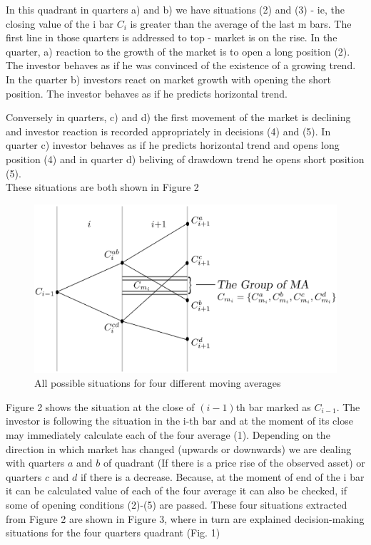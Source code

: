 \documentclass{tewiart}
\begin{document}
In this quadrant in quarters a) and b) we have situations (2) and (3) - ie, the closing value of the i bar $C_i$ is greater than the average of the last m bars. The first line in those quarters is addressed to top - market is on the rise. In the quarter, a) reaction to the growth of the market is to open a long position (2). The investor behaves as if he was convinced of the existence of a growing trend. In the quarter b) investors react on market growth with opening the short position. The investor behaves as if he predicts horizontal trend.

Conversely in quarters, c) and d) the first movement of the market is declining and investor reaction is recorded appropriately in decisions (4) and (5). In quarter c) investor behaves as if he predicts horizontal trend and opens long position (4) and in quarter d) beliving of drawdown trend he opens short position (5). \\
These situations are both shown in Figure 2\\
\begin{figure}[h]
\centering
\centering 
\includegraphics[width=\textwidth]{rysunek1pp.eps}
\caption{All possible situations for four different moving averages}
\end{figure}
\FloatBarrier
\indent Figure 2 shows the situation at the close of $(i-1)$th bar marked as $C_{i-1}$. The investor is following the situation in the i-th bar and at the moment of its close may immediately calculate each of the four average (1). Depending on the direction in which market has changed (upwards or downwards) we are dealing with quarters $a$ and $b$ of quadrant (If there is a price rise of the observed asset) or quarters $c$ and $d$ if there is a decrease.
Because, at the moment of end of the i bar it can be calculated  value of each of the four average it can also be checked, if some of opening conditions (2)-(5) are passed. These four situations extracted from Figure 2 are shown in Figure 3, where in turn are explained  decision-making situations for the four quarters quadrant (Fig. 1)\\
\end{document}
